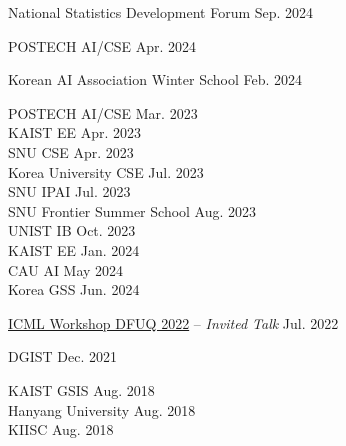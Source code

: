 {
{}
{National Statistics Development Forum \hfill Sep. 2024}

{}
{POSTECH AI/CSE \hfill Apr. 2024}

{}
{Korean AI Association Winter School \hfill Feb. 2024}

{}
{
POSTECH AI/CSE \hfill Mar. 2023 \\
KAIST EE \hfill Apr. 2023 \\
SNU CSE  \hfill Apr. 2023 \\
Korea University CSE \hfill Jul. 2023 \\
SNU IPAI \hfill Jul. 2023 \\
SNU Frontier Summer School \hfill Aug. 2023 \\
UNIST IB \hfill Oct. 2023 \\
KAIST EE \hfill Jan. 2024 \\
CAU AI \hfill May 2024 \\
Korea GSS \hfill Jun. 2024}

{}
{\href{https://sites.google.com/berkeley.edu/dfuq-22/home}{ICML Workshop DFUQ 2022} -- \emph{Invited Talk} \hfill Jul. 2022} 

{}
{DGIST \hfill Dec. 2021}

{}
{KAIST GSIS \hfill Aug. 2018 \\ Hanyang University \hfill Aug. 2018 \\ KIISC \hfill Aug. 2018}


}




